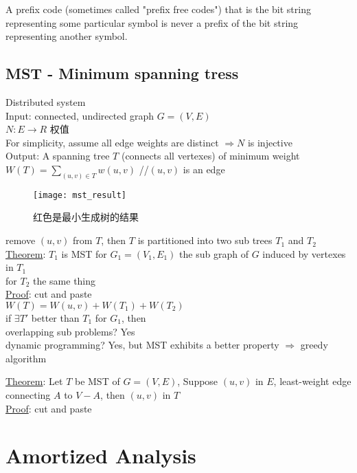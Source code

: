 \documentclass{article}
\begin{document}
A prefix code (sometimes called "prefix free codes") that is the bit string representing some particular symbol is never a prefix of the bit string representing another symbol.

\subsection{MST - Minimum spanning tress}
Distributed system\\
Input: connected, undirected graph $G=(V, E)$\\
$N: E \rightarrow R$ 权值\\
For simplicity, assume all edge weights are distinct $\Rightarrow N$ is injective\\
Output: A spanning tree $T$ (connects all vertexes) of minimum weight\\
	$W(T) = \sum_{(u, v) \in T} w(u, v)$ //$(u,v)$ is an edge

\begin{figure}[htbp]
  \centering
  \texttt{[image: mst\_result]}\\
  \caption{红色是最小生成树的结果}\label{fig.mst.result}
\end{figure}

remove $(u, v)$ from $T$, then $T$ is partitioned into two sub trees $T_1$ and $T_2$\\

\noindent
\underline{Theorem}: $T_1$ is MST for $G_1 = (V_1, E_1)$ the sub graph of $G$ induced by vertexes in $T_1$\\
for $T_2$ the same thing\\
\underline{Proof}: cut and paste\\
$W(T) = W(u, v) + W(T_1) + W(T_2)$\\
if $\exists T'$ better than $T_1$ for $G_1$, then\\
overlapping sub problems? Yes\\
dynamic programming? Yes, but MST exhibits a better property $\Rightarrow$ greedy algorithm

\noindent
\underline{Theorem}: Let $T$ be MST of $G=(V, E)$, Suppose $(u,v)$ in $E$, least-weight edge connecting $A$ to $V-A$, then $(u,v)$ in $T$\\
\underline{Proof}: cut and paste

\section{Amortized Analysis}
\end{document}
